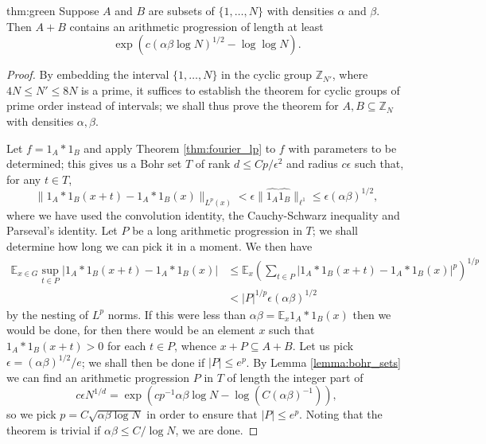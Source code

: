 \documentclass[12pt,a4paper,reqno]{amsart}
\numberwithin{equation}{section}
\theoremstyle{plain}
\theoremstyle{definition}
\renewcommand{\leq}{\leqslant}
\renewcommand{\subset}{\subseteq}
\def\E{\mathbb{E}}
\def\Z{\mathbb{Z}}
\newcommand{\Zmod}[1]{\Z_{#1}} %
\providecommand{\abs}[1]{\lvert#1\rvert}
\providecommand{\norm}[1]{\lVert #1 \rVert}
\theoremstyle{plain}
\begin{document}
\begin{reptheorem}{thm:green}
Suppose $A$ and $B$ are subsets of $\{1,\ldots,N\}$ with densities $\alpha$ and $\beta$. Then $A+B$ contains an arithmetic progression of length at least
\[ \exp\left( c (\alpha \beta \log N)^{1/2} - \log\log N\right). \]
\end{reptheorem}
\begin{proof}
By embedding the interval $\{1,\ldots,N\}$ in the cyclic group $\Zmod{N'}$, where $4N \leq N' \leq 8N$ is a prime, it suffices to establish the theorem for cyclic groups of prime order instead of intervals; we shall thus prove the theorem for $A, B \subset \Zmod{N}$ with densities $\alpha, \beta$.

Let $f = 1_A*1_B$ and apply Theorem \ref{thm:fourier_lp} to $f$ with parameters to be determined; this gives us a Bohr set $T$ of rank $d \leq Cp/\epsilon^2$ and radius $c\epsilon$ such that, for any $t \in T$,
\[ \norm{ 1_A*1_B(x+t) - 1_A*1_B(x) }_{L^p(x)} < \epsilon \norm{\widehat{1_A} \widehat{1_B}}_{\ell^1} \leq \epsilon (\alpha \beta)^{1/2}, \]
where we have used the convolution identity, the Cauchy-Schwarz inequality and Parseval's identity. Let $P$ be a long arithmetic progression in $T$; we shall determine how long we can pick it in a moment. We then have
\begin{align*}
\E_{x \in G} \sup_{t \in P} \abs{ 1_A*1_B(x+t) - 1_A*1_B(x) } &\leq \E_x \left( \sum_{t \in P} \abs{ 1_A*1_B(x+t) - 1_A*1_B(x) }^p \right)^{1/p} \\
&< \abs{P}^{1/p} \epsilon (\alpha \beta)^{1/2}
\end{align*}
by the nesting of $L^p$ norms. If this were less than $\alpha \beta = \E_x 1_A*1_B(x)$ then we would be done, for then there would be an element $x$ such that $1_A*1_B(x+t) > 0$ for each $t \in P$, whence $x+P \subset A+B$. Let us pick $\epsilon = (\alpha \beta)^{1/2}/e$; we shall then be done if $\abs{P} \leq e^p$. By Lemma \ref{lemma:bohr_sets} we can find an arithmetic progression $P$ in $T$ of length the integer part of
\[ c\epsilon N^{1/d} = \exp\left( c p^{-1} \alpha \beta \log N - \log(C (\alpha \beta)^{-1} ) \right), \]
so we pick $p = C \sqrt{ \alpha \beta \log N }$ in order to ensure that $\abs{P} \leq e^p$. Noting that the theorem is trivial if $\alpha \beta \leq C/\log N$, we are done. 
\end{proof}
\end{document}
